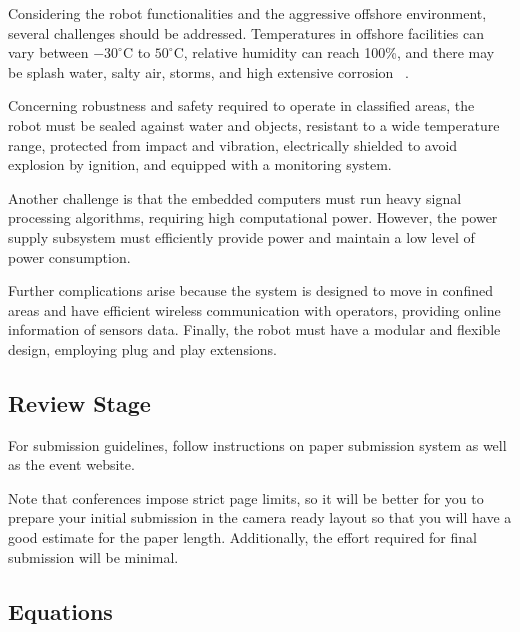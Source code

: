 \documentclass{ifacconf}
\begin{document}
Considering the robot functionalities and the aggressive offshore environment,
several challenges should be addressed. Temperatures in offshore facilities can
vary between $-30^{\circ}$C to $50^{\circ}$C, relative humidity can reach
100\%, and there may be splash water, salty air, storms, and high extensive
corrosion ~\cite{graf2007mobile}. 

Concerning robustness and safety required to operate in classified areas, the
robot must be sealed against water and objects, resistant to a wide temperature
range, protected from impact and vibration, electrically shielded to avoid
explosion by ignition, and equipped with a monitoring system.


Another challenge is that the embedded computers must run heavy signal
processing algorithms, requiring high computational power. However, the power
supply subsystem must efficiently provide power and maintain a low level of
power consumption.

Further complications arise because the system is designed to move in confined
areas and have efficient wireless communication with operators, providing
online information of sensors data. Finally, the robot must have a modular and
flexible design, employing plug and play extensions.%

\subsection{Review Stage}

For submission guidelines, follow instructions on paper submission
system as well as the event website.

Note that conferences impose strict page limits, so it will be better
for you to prepare your initial submission in the camera ready layout
so that you will have a good estimate for the paper
length. Additionally, the effort required for final submission will be
minimal.

\subsection{Equations}
\end{document}
